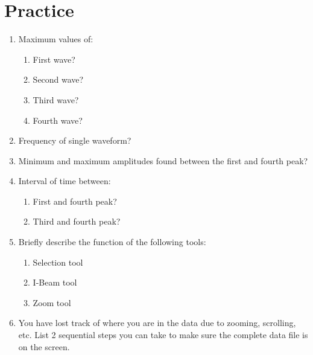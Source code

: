 \documentclass{article}
\begin{document}
\section*{Practice}
\begin{enumerate}
			\item Maximum values of:
				\begin{enumerate}
					\item First wave?\vspace{0.5cm}
					\item Second wave?\vspace{0.5cm}
					\item Third wave?\vspace{0.5cm}
					\item Fourth wave?\vspace{0.5cm}
				\end{enumerate}
			\item Frequency of single waveform?\vspace{1cm}
			\item Minimum and maximum amplitudes found between the first and fourth peak?\vspace{1cm}
			\item Interval of time between:
				\begin{enumerate}
					\item First and fourth peak?\vspace{0.5cm}
					\item Third and fourth peak?\vspace{0.5cm}
				\end{enumerate}
			\item Briefly describe the function of the following tools:
				\begin{enumerate}
					\item Selection tool\vspace{1cm}
					\item I-Beam tool\vspace{1cm}
					\item Zoom tool\vspace{1cm}
				\end{enumerate}
			\item You have lost track of where you are in the data due to zooming, scrolling, etc. List 2 sequential steps you can take to make sure the complete data file is on the screen.
		\end{enumerate}
\end{document}
